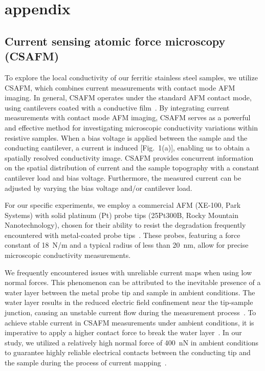 \documentclass[jkps,reprint,twocolumn,showkeys]{revtex4}
\begin{document}
\section{appendix}
\subsection{Current sensing atomic force microscopy (CSAFM)}
To explore the local conductivity of our ferritic stainless steel samples, we utilize CSAFM, which combines current measurements with contact mode AFM imaging.
In general, CSAFM operates under the standard AFM contact mode, using cantilevers coated with a conductive film~\cite{houze1996ImagingLocalElectrical, Hui2019}.
By integrating current measurements with contact mode AFM imaging, CSAFM serves as a powerful and effective method for investigating microscopic conductivity variations within resistive samples.
When a bias voltage is applied between the sample and the conducting cantilever, a current is induced [Fig.~1(a)], enabling us to obtain a spatially resolved conductivity image. 
CSAFM provides concurrent information on the spatial distribution of current and the sample topography with a constant cantilever load and bias voltage.
Furthermore, the measured current can be adjusted by varying the bias voltage and/or cantilever load.

For our specific experiments, we employ a commercial AFM (XE-100, Park Systems) with solid platinum (Pt) probe tips (25Pt300B, Rocky Mountain Nanotechnology), chosen for their ability to resist the degradation frequently encountered with metal-coated probe tips~\cite{Jiang2019, weber2023SolidPlatinumNanoprobes, lantz1998CharacterizationTipsConducting}. 
These probes, featuring a force constant of 18~N/m and a typical radius of less than 20~nm, allow for precise microscopic conductivity measurements.

We frequently encountered issues with unreliable current maps when using low normal forces.
This phenomenon can be attributed to the inevitable presence of a water layer between the metal probe tip and sample in ambient conditions.
The water layer results in the reduced electric field confinement near the tip-sample junction, causing an unstable current flow during the measurement process~\cite{Jiang2019, kremmer2003ModificationCharacterizationThin}.
To achieve stable current in CSAFM measurements under ambient conditions, it is imperative to apply a higher contact force to break the water layer~\cite{Jiang2019}.
In our study, we utilized a relatively high normal force of 400~nN in ambient conditions to guarantee highly reliable electrical contacts between the conducting tip and the sample during the process of current mapping~\cite{bietsch2000ElectricalTestingGold}.
\end{document}
